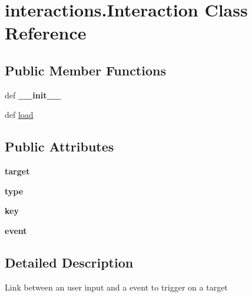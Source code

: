 \hypertarget{classinteractions_1_1_interaction}{\section{interactions.\-Interaction \-Class \-Reference}
\label{classinteractions_1_1_interaction}
}
\subsection*{\-Public \-Member \-Functions}
\begin{DoxyCompactItemize}
\item 
\hypertarget{classinteractions_1_1_interaction_aaa6e9bc32038ac4f7d2bcd294e5e85b5}{def {\bfseries \-\_\-\-\_\-init\-\_\-\-\_\-}}\label{classinteractions_1_1_interaction_aaa6e9bc32038ac4f7d2bcd294e5e85b5}

\item 
def \hyperlink{classinteractions_1_1_interaction_a71af2ff170e4f1debf8ed4c6744345cc}{load}
\end{DoxyCompactItemize}
\subsection*{\-Public \-Attributes}
\begin{DoxyCompactItemize}
\item 
\hypertarget{classinteractions_1_1_interaction_a0f4421e15900e2969a00b387b1a106e7}{{\bfseries target}}\label{classinteractions_1_1_interaction_a0f4421e15900e2969a00b387b1a106e7}

\item 
\hypertarget{classinteractions_1_1_interaction_af6ed27e94e03e0ee01fac332fc95bdf4}{{\bfseries type}}\label{classinteractions_1_1_interaction_af6ed27e94e03e0ee01fac332fc95bdf4}

\item 
\hypertarget{classinteractions_1_1_interaction_a86c59f8f535237eda4da810aa0176183}{{\bfseries key}}\label{classinteractions_1_1_interaction_a86c59f8f535237eda4da810aa0176183}

\item 
\hypertarget{classinteractions_1_1_interaction_a4f475a53f0a9b31dee3046d60809d347}{{\bfseries event}}\label{classinteractions_1_1_interaction_a4f475a53f0a9b31dee3046d60809d347}

\end{DoxyCompactItemize}


\subsection{\-Detailed \-Description}
\begin{DoxyVerb}Link between an user input and a event to trigger on a target \end{DoxyVerb}
 

